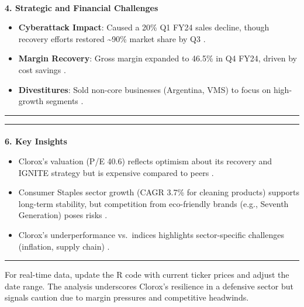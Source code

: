 \documentclass[
  letterpaper,
  DIV=11,
  numbers=noendperiod]{scrartcl}
\makeatletter
\let\oldparagraph\paragraph
\renewcommand{\paragraph}{
    \@ifstar
      \xxxParagraphStar
      \xxxParagraphNoStar
  }
\newcommand{\xxxParagraphStar}[1]{\oldparagraph*{#1}\mbox{}}
\newcommand{\xxxParagraphNoStar}[1]{\oldparagraph{#1}\mbox{}}
\providecommand{\tightlist}{%
  \setlength{\itemsep}{0pt}\setlength{\parskip}{0pt}}\usepackage{longtable,booktabs,array}
\makeatother
\begin{document}
\paragraph{\texorpdfstring{\textbf{4. Strategic and Financial
Challenges}}{4. Strategic and Financial Challenges}}\label{strategic-and-financial-challenges}

\begin{itemize}
\tightlist
\item
  \textbf{Cyberattack Impact}: Caused a 20\% Q1 FY24 sales decline,
  though recovery efforts restored \textasciitilde90\% market share by
  Q3 .
\item
  \textbf{Margin Recovery}: Gross margin expanded to 46.5\% in Q4 FY24,
  driven by cost savings .
\item
  \textbf{Divestitures}: Sold non-core businesses (Argentina, VMS) to
  focus on high-growth segments .
\end{itemize}

\begin{center}\rule{0.5\linewidth}{0.5pt}\end{center}

\begin{center}\rule{0.5\linewidth}{0.5pt}\end{center}

\paragraph{\texorpdfstring{\textbf{6. Key
Insights}}{6. Key Insights}}\label{key-insights}

\begin{itemize}
\tightlist
\item
  Clorox's valuation (P/E 40.6) reflects optimism about its recovery and
  IGNITE strategy but is expensive compared to peers .
\item
  Consumer Staples sector growth (CAGR 3.7\% for cleaning products)
  supports long-term stability, but competition from eco-friendly brands
  (e.g., Seventh Generation) poses risks .
\item
  Clorox's underperformance vs.~indices highlights sector-specific
  challenges (inflation, supply chain) .
\end{itemize}

\begin{center}\rule{0.5\linewidth}{0.5pt}\end{center}

For real-time data, update the R code with current ticker prices and
adjust the date range. The analysis underscores Clorox's resilience in a
defensive sector but signals caution due to margin pressures and
competitive headwinds.
\end{document}
